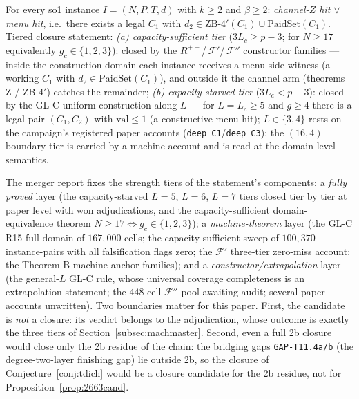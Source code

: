 \begin{conjecture}\label{conj:tdich}
For every so1 instance $I=(N,P,T,d)$ with $k\ge2$ and $\beta\ge2$:
\emph{channel-$Z$ hit $\lor$ menu hit}, i.e.\ there exists a legal
$C_1$ with
$d_2\in \mathrm{ZB}\text{-}4'(C_1)\cup \mathrm{PaidSet}(C_1)$.
Tiered closure statement:
\emph{(a) capacity-sufficient tier} ($3L_c\ge p-3$; for $N\ge17$
equivalently $g_c\in\{1,2,3\}$): closed by the
$R^{++}$/\,$\mathcal{F}'$/\,$\mathcal{F}''$ constructor families ---
inside the construction domain each instance receives a menu-side witness
(a working $C_1$ with $d_2\in\mathrm{PaidSet}(C_1)$), and outside it the
channel arm (theorems Z / ZB-4$'$) catches the remainder;
\emph{(b) capacity-starved tier} ($3L_c<p-3$): closed by the GL-C uniform
construction along $L$ --- for $L=L_c\ge5$ and $g\ge4$ there is a legal
pair $(C_1,C_2)$ with $\mathrm{val}\le1$ (a constructive menu hit);
$L\in\{3,4\}$ rests on the campaign's registered paper accounts
(\texttt{deep\_C1}/\texttt{deep\_C3}); the $(16,4)$ boundary tier is
carried by a machine account and is read at the domain-level semantics.
\end{conjecture}

The merger report fixes the strength tiers of the statement's components: a
\emph{fully proved} layer (the capacity-starved $L=5$, $L=6$, $L=7$ tiers
closed tier by tier at paper level with won adjudications, and the
capacity-sufficient domain-equivalence theorem $N\ge17\iff g_c\in\{1,2,3\}$);
a \emph{machine-theorem} layer (the GL-C R15 full domain of $167{,}000$
cells; the capacity-sufficient sweep of $100{,}370$ instance-pairs with all
falsification flags zero; the $\mathcal{F}'$ three-tier zero-miss account;
the Theorem-B machine anchor families); and a \emph{constructor/extrapolation}
layer (the general-$L$ GL-C rule, whose universal coverage completeness is an
extrapolation statement; the $448$-cell $\mathcal{F}''$ pool awaiting audit;
several paper accounts unwritten). Two boundaries matter for this paper.
First, the candidate is \emph{not} a closure: its verdict belongs to the
adjudication, whose outcome is exactly the three tiers of
Section~\ref{subsec:machmaster}. Second, even a full 2b closure would close
only the 2b residue of the chain: the bridging gaps \texttt{GAP-T11.4a/b}
(the degree-two-layer finishing gap) lie outside 2b, so the closure of
Conjecture~\ref{conj:tdich} would be a closure candidate for the 2b residue,
not for Proposition~\ref{prop:2663cand}.

